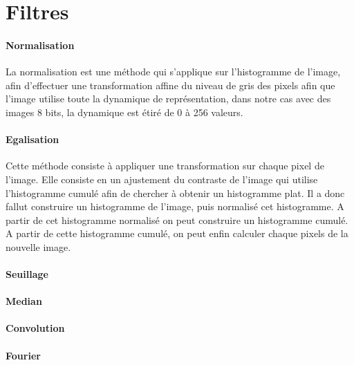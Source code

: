 \section{Filtres}
	
	\paragraph{Normalisation}

	La normalisation est une méthode qui s'applique sur l'histogramme de l'image, afin d'effectuer une transformation affine du niveau de gris des pixels afin que l'image utilise toute la dynamique de représentation, dans notre cas avec des images 8 bits, la dynamique est étiré de 0 à 256 valeurs.


	\paragraph{Egalisation}

	Cette méthode consiste à appliquer une transformation sur chaque pixel de l'image. Elle consiste en un ajustement du contraste de l'image qui utilise l'histogramme cumulé afin de chercher à obtenir un histogramme plat. Il a donc fallut construire un histogramme de l'image, puis normalisé cet histogramme. A partir de cet histogramme normalisé on peut construire un histogramme cumulé. A partir de cette histogramme cumulé, on peut enfin calculer chaque pixels de la nouvelle image.
	
	\paragraph{Seuillage}
	
	\paragraph{Median}
	
	\paragraph{Convolution}
	
	\paragraph{Fourier}